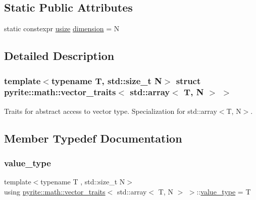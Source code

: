 \subsection*{Static Public Attributes}
\begin{DoxyCompactItemize}
\item 
static constexpr \mbox{\hyperlink{type_8hpp_a3984e6dc0a53b867e054e8447f2f2be1}{usize}} \mbox{\hyperlink{structpyrite_1_1math_1_1vector__traits_3_01std_1_1array_3_01_t_00_01_n_01_4_01_4_ab1070748cd19aba5438d5637109c8a62}{dimension}} = N
\end{DoxyCompactItemize}


\subsection{Detailed Description}
\subsubsection*{template$<$typename T, std\+::size\+\_\+t N$>$\newline
struct pyrite\+::math\+::vector\+\_\+traits$<$ std\+::array$<$ T, N $>$ $>$}

Traits for abstract access to vector type. Specialization for std\+::array$<$\+T, N$>$. 

\subsection{Member Typedef Documentation}
\mbox{\label{structpyrite_1_1math_1_1vector__traits_3_01std_1_1array_3_01_t_00_01_n_01_4_01_4_ac0670c23e2c162f7e82457937744950b}} 
\subsubsection{\texorpdfstring{value\+\_\+type}{value\_type}}
{\footnotesize\ttfamily template$<$typename T , std\+::size\+\_\+t N$>$ \\
using \mbox{\hyperlink{structpyrite_1_1math_1_1vector__traits}{pyrite\+::math\+::vector\+\_\+traits}}$<$ std\+::array$<$ T, N $>$ $>$\+::\mbox{\hyperlink{structpyrite_1_1math_1_1vector__traits_3_01std_1_1array_3_01_t_00_01_n_01_4_01_4_ac0670c23e2c162f7e82457937744950b}{value\+\_\+type}} =  T}

